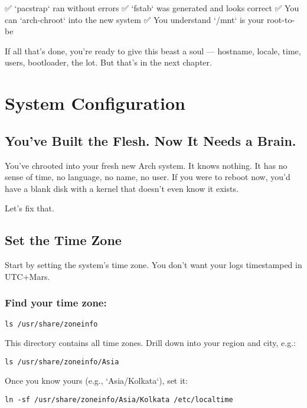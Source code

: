 \documentclass[12pt]{book}
\begin{document}
✅ `pacstrap` ran without errors  
✅ `fstab` was generated and looks correct  
✅ You can `arch-chroot` into the new system  
✅ You understand `/mnt` is your root-to-be

If all that's done, you’re ready to give this beast a soul — hostname, locale, time, users, bootloader, the lot. But that’s in the next chapter.

\clearpage


\chapter{System Configuration}

\section*{You've Built the Flesh. Now It Needs a Brain.}

You've chrooted into your fresh new Arch system. It knows nothing. It has no sense of time, no language, no name, no user. If you were to reboot now, you'd have a blank disk with a kernel that doesn't even know it exists.

Let’s fix that.

\section{Set the Time Zone}

Start by setting the system’s time zone. You don’t want your logs timestamped in UTC+Mars.

\subsection*{Find your time zone:}

\begin{lstlisting}
ls /usr/share/zoneinfo
\end{lstlisting}

This directory contains all time zones. Drill down into your region and city, e.g.:

\begin{lstlisting}
ls /usr/share/zoneinfo/Asia
\end{lstlisting}

Once you know yours (e.g., `Asia/Kolkata`), set it:

\begin{lstlisting}
ln -sf /usr/share/zoneinfo/Asia/Kolkata /etc/localtime
\end{lstlisting}
\end{document}
